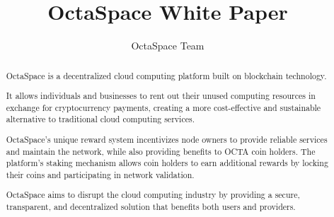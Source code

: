 \documentclass[a4paper]{article}
\begin{document}
\title{OctaSpace White Paper}

\author{OctaSpace Team}

\maketitle

\tableofcontents
\newpage

\begin{abstract}
    OctaSpace is a decentralized cloud computing platform built on blockchain technology.

    It allows individuals and businesses to rent out their unused computing resources in exchange for cryptocurrency payments,
    creating a more cost-effective and sustainable alternative to traditional cloud computing services.

    OctaSpace's unique reward system incentivizes node owners to provide reliable services and maintain the network, while also providing benefits to OCTA coin holders.
    The platform's staking mechanism allows coin holders to earn additional rewards by locking their coins and participating in network validation.

    OctaSpace aims to disrupt the cloud computing industry by providing a secure, transparent, and decentralized solution that benefits both users and providers.
\end{abstract}
\newpage


\newpage

\newpage

\newpage

\newpage

\newpage




\end{document}
